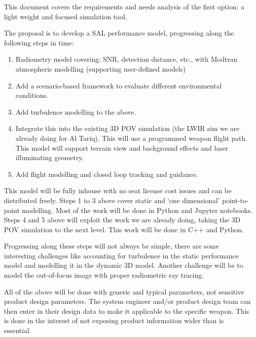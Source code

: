 This document covers the requirements and needs analysis of the first option: a light weight and focused simulation tool.

The proposal is to develop a \ac{SAL} performance model, progressing along the following steps in time:
\begin{enumerate}
    \item Radiometry model covering: \ac{SNR}, detection distance, etc., with Modtran atmospheric modelling (supporting user-defined models)
    \item Add a scenario-based framework to evaluate different environmental conditions.
    \item Add turbulence modelling to the above.
    \item Integrate this into the existing \ac{3D} \ac{POV} simulation (the \ac{LWIR} sim we are already doing for Al Tariq). This will use a programmed weapon flight path. This model will support terrain view and background effects and laser illuminating geometry.
    \item Add flight modelling and closed loop tracking and guidance.
\end{enumerate}


This model will be fully inhouse with no seat license cost issues and can be distributed freely.
Steps 1 to 3 above cover static and `one dimensional' point-to-point modelling. Most of the work will be done in Python and Jupyter notebooks.
Steps 4 and 5 above will exploit the work we are already doing, taking the 3D \ac{POV} simulation to the next level. This work will be done in C++ and Python.

Progressing along these steps will not always be simple, there are some interesting challenges like accounting for turbulence in the static performance model and modelling it in the dynamic \ac{3D} model.  Another challenge will be to model the out-of-focus image with proper radiometric ray tracing.

All of the above will be done with generic and typical parameters, not sensitive product design parameters.
The system engineer and/or product design team can then enter in their design data to make it applicable to the specific weapon.
This is done in the interest of not exposing product information wider than is essential.
